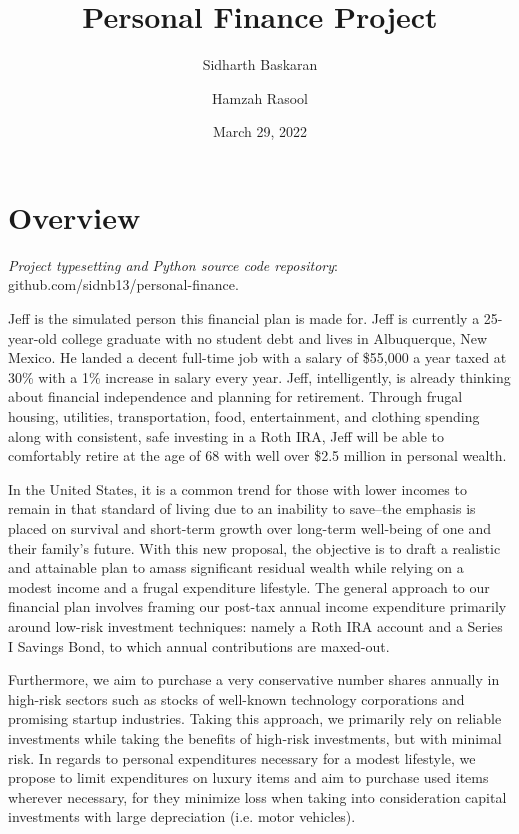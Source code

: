 \documentclass[12pt]{article}
\title{Personal Finance Project}
\author[1]{Sidharth Baskaran}
\author[1]{Hamzah Rasool}
\affil[1]{Liberal Arts and Science Academy}
\date{March 29, 2022}
\begin{document}
\maketitle

\tableofcontents
\newpage

\section{Overview}

\textit{Project typesetting and Python source code repository}: {\color{blue} github.com/sidnb13/personal-finance}.

Jeff is the simulated person this financial plan is made for. Jeff is currently a 25-year-old college graduate with no student debt and lives in Albuquerque, New Mexico. He landed a decent full-time job with a salary of \$55,000 a year taxed at 30\% with a 1\% increase in salary every year. Jeff, intelligently, is already thinking about financial independence and planning for retirement. Through frugal housing, utilities, transportation, food, entertainment, and clothing spending along with consistent, safe investing in a Roth IRA, Jeff will be able to comfortably retire at the age of 68 with well over \$2.5 million in personal wealth.

In the United States, it is a common trend for those with lower incomes to remain in that standard of living
due to an inability to save--the emphasis is placed on survival and short-term growth over long-term well-being of one and their family's future.
With this new proposal, the objective is to draft a realistic and attainable plan
to amass significant residual wealth while relying on a modest income and a frugal expenditure lifestyle.
The general approach to our financial plan involves framing our post-tax annual income expenditure primarily around
low-risk investment techniques: namely a Roth IRA account and a Series I Savings Bond, to which annual contributions are maxed-out.

Furthermore, we aim to purchase a very conservative number shares annually in high-risk sectors such as stocks
of well-known technology corporations and promising startup industries. Taking this approach, we
primarily rely on reliable investments while taking the benefits of high-risk investments, but with minimal risk.
In regards to personal expenditures necessary for a modest lifestyle, we propose to limit expenditures on luxury items
and aim to purchase used items wherever necessary, for they minimize loss when taking into consideration
capital investments with large depreciation (i.e. motor vehicles).
\end{document}
